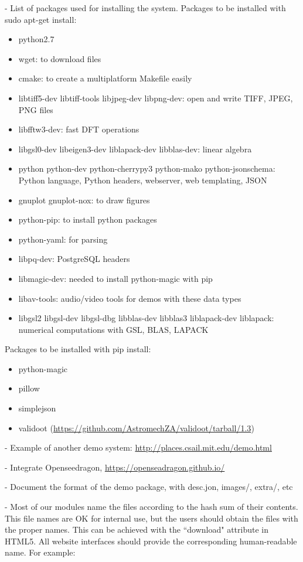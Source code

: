 \documentclass[a4paper,12pt]{article}
\begin{document}
- List of packages used for installing the system. Packages to be installed with sudo apt-get install:

\begin{itemize}
\item python2.7
\item wget: to download files
\item cmake: to create a multiplatform Makefile easily
\item libtiff5-dev libtiff-tools libjpeg-dev libpng-dev: open and write TIFF, JPEG, PNG files
\item libfftw3-dev: fast DFT operations
\item libgsl0-dev libeigen3-dev liblapack-dev libblas-dev: linear algebra
\item python python-dev python-cherrypy3 python-mako python-jsonschema: Python language, Python headers, webserver, web templating, JSON
\item gnuplot gnuplot-nox: to draw figures
\item python-pip: to install python packages
\item python-yaml: for parsing
\item libpq-dev: PostgreSQL headers
\item libmagic-dev: needed to install python-magic with pip
\item libav-tools: audio/video tools for demos with these data types
\item libgsl2 libgsl-dev libgsl-dbg  libblas-dev libblas3 liblapack-dev liblapack: numerical computations with GSL, BLAS, LAPACK
\end{itemize}

Packages to be installed with pip install:
\begin{itemize}
\item python-magic
\item pillow
\item simplejson
\item validoot (\url{https://github.com/AstromechZA/validoot/tarball/1.3})
\end{itemize}

- Example of another demo system: \url{http://places.csail.mit.edu/demo.html}

- Integrate Openseedragon, \url{https://openseadragon.github.io/}

- Document the format of the demo package, with desc.jon, images/, extra/, etc

- Most of our modules name the files according to the hash sum of their contents. This file names are OK for internal use, but the users should obtain the files with the proper names. This can be achieved with the ``download" attribute in HTML5. All website interfaces should provide the corresponding human-readable name. For example:
\end{document}
